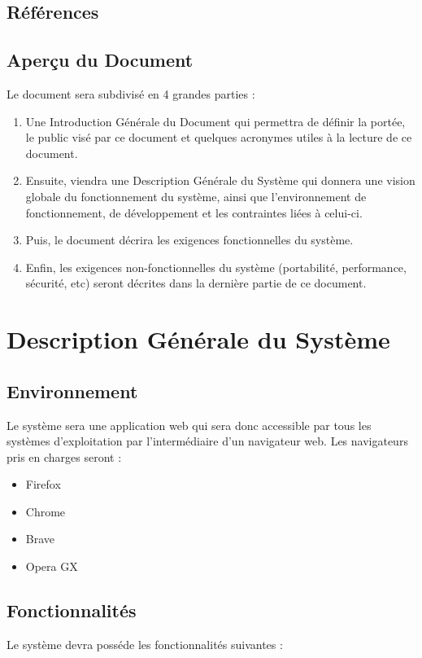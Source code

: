 \documentclass[a4paper, 12pt]{article}
\begin{document}
        \subsection{Références}

        \subsection{Aperçu du Document}
        Le document sera subdivisé en 4 grandes parties :
        \begin{enumerate}
            \item Une Introduction Générale du Document qui permettra de définir la portée, le public visé par ce document et quelques acronymes utiles à la lecture de ce document.
            \item Ensuite, viendra une Description Générale du Système qui donnera une vision globale du fonctionnement du système, ainsi que l'environnement de fonctionnement, de développement et les contraintes liées à celui-ci.
            \item Puis, le document décrira les exigences fonctionnelles du système.
            \item Enfin, les exigences non-fonctionnelles du système (portabilité, performance, sécurité, etc) seront décrites dans la dernière partie de ce document.
        \end{enumerate}
    
    \newpage

    \section{Description Générale du Système}
        \subsection{Environnement}
        Le système sera une application web qui sera donc accessible par tous les systèmes d'exploitation par l'intermédiaire d'un navigateur web. 
        Les navigateurs pris en charges seront :
        \begin{itemize}
            \item Firefox
            \item Chrome
            \item Brave 
            \item Opera GX
        \end{itemize}

        \subsection{Fonctionnalités}
        Le système devra posséde les fonctionnalités suivantes :
    
\end{document}
